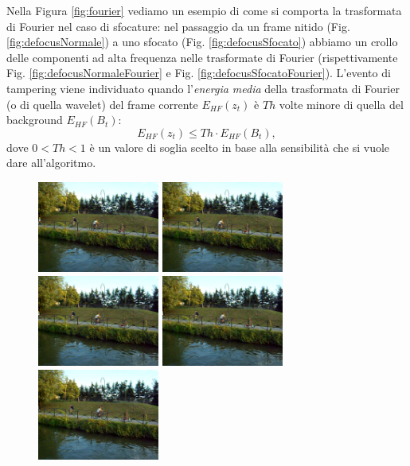 Nella Figura \ref{fig:fourier} vediamo un esempio di come si comporta la trasformata di Fourier nel caso di sfocature: 
nel passaggio da un frame nitido (Fig. \ref{fig:defocusNormale}) a uno sfocato (Fig. \ref{fig:defocusSfocato}) abbiamo un crollo delle componenti ad alta frequenza nelle trasformate di Fourier (rispettivamente Fig. \ref{fig:defocusNormaleFourier} e Fig. \ref{fig:defocusSfocatoFourier}).
L'evento di tampering viene individuato quando l'\textit{energia media} della trasformata di Fourier (o di quella wavelet) del frame corrente $E_{HF}(z_t)$ \`e $Th$ volte minore di quella del background $E_{HF}(B_t)$:
\[E_{HF}(z_t)\leq Th \cdot E_{HF}(B_t),\]
dove $0<Th<1$ \`e  un valore di soglia scelto in base alla sensibilit\`a che si vuole dare all'algoritmo.\\
\begin{figure}[tb]
	\centering
	\includegraphics[width = 4cm]{./pictures/FPSalto/img0001}
	\includegraphics[width = 4cm]{./pictures/FPSalto/img0002}
	\includegraphics[width = 4cm]{./pictures/FPSalto/img0003}
	\includegraphics[width = 4cm]{./pictures/FPSalto/img0004}
	\includegraphics[width = 4cm]{./pictures/FPSalto/img0005}

\end{figure}
